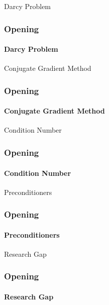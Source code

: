 \begin{frame}{Darcy Problem}
    \frametitle{Opening}
    \framesubtitle{Darcy Problem}
\end{frame}

\begin{frame}{Conjugate Gradient Method}
    \frametitle{Opening}
    \framesubtitle{Conjugate Gradient Method}
\end{frame}

\begin{frame}{Condition Number}
    \frametitle{Opening}
    \framesubtitle{Condition Number}
\end{frame}

\begin{frame}{Preconditioners}
    \frametitle{Opening}
    \framesubtitle{Preconditioners}
\end{frame}

\begin{frame}{Research Gap}
    \frametitle{Opening}
    \framesubtitle{Research Gap}
\end{frame}